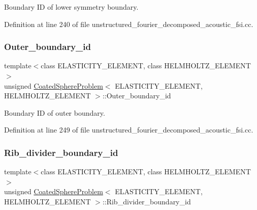 Boundary ID of lower symmetry boundary. 



Definition at line 240 of file unstructured\+\_\+fourier\+\_\+decomposed\+\_\+acoustic\+\_\+fsi.\+cc.

\mbox{\label{classCoatedSphereProblem_abf88cdcfd5fe2e91dde565ef0801ed47}} 
\subsubsection{\texorpdfstring{Outer\+\_\+boundary\+\_\+id}{Outer\_boundary\_id}}
{\footnotesize\ttfamily template$<$class E\+L\+A\+S\+T\+I\+C\+I\+T\+Y\+\_\+\+E\+L\+E\+M\+E\+NT, class H\+E\+L\+M\+H\+O\+L\+T\+Z\+\_\+\+E\+L\+E\+M\+E\+NT$>$ \\
unsigned \hyperlink{classCoatedSphereProblem}{Coated\+Sphere\+Problem}$<$ E\+L\+A\+S\+T\+I\+C\+I\+T\+Y\+\_\+\+E\+L\+E\+M\+E\+NT, H\+E\+L\+M\+H\+O\+L\+T\+Z\+\_\+\+E\+L\+E\+M\+E\+NT $>$\+::Outer\+\_\+boundary\+\_\+id\hspace{0.3cm}{\ttfamily [private]}}



Boundary ID of outer boundary. 



Definition at line 249 of file unstructured\+\_\+fourier\+\_\+decomposed\+\_\+acoustic\+\_\+fsi.\+cc.

\mbox{\label{classCoatedSphereProblem_a4eeb21412dc4a62d33c03048286fb4b6}} 
\subsubsection{\texorpdfstring{Rib\+\_\+divider\+\_\+boundary\+\_\+id}{Rib\_divider\_boundary\_id}}
{\footnotesize\ttfamily template$<$class E\+L\+A\+S\+T\+I\+C\+I\+T\+Y\+\_\+\+E\+L\+E\+M\+E\+NT, class H\+E\+L\+M\+H\+O\+L\+T\+Z\+\_\+\+E\+L\+E\+M\+E\+NT$>$ \\
unsigned \hyperlink{classCoatedSphereProblem}{Coated\+Sphere\+Problem}$<$ E\+L\+A\+S\+T\+I\+C\+I\+T\+Y\+\_\+\+E\+L\+E\+M\+E\+NT, H\+E\+L\+M\+H\+O\+L\+T\+Z\+\_\+\+E\+L\+E\+M\+E\+NT $>$\+::Rib\+\_\+divider\+\_\+boundary\+\_\+id\hspace{0.3cm}{\ttfamily [private]}}



